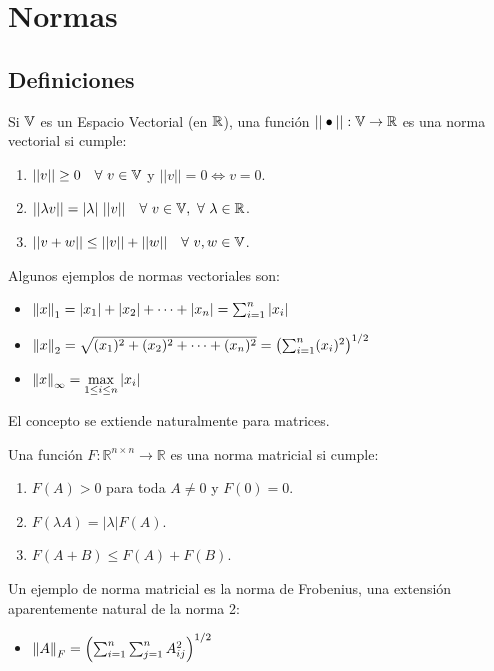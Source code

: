 \section{Normas}

\subsection{Definiciones}

\begin{defi}
Si $\mathbb{V}$ es un Espacio Vectorial (en $\mathbb{R}$), una función
$|| \bullet || : \mathbb{V} \to \mathbb{R}$ es una norma vectorial si cumple:
\begin{enumerate}
\item $||v|| \geq 0 \quad \forall\ v \in \mathbb{V}$ y $||v|| = 0 \iff v = 0$.
\item $||\lambda v|| = |\lambda|\ ||v|| \quad \forall\ v \in \mathbb{V},\ \forall\ \lambda \in \mathbb{R}$.
\item $||v + w|| \leq ||v|| + ||w|| \quad \forall\ v,w \in \mathbb{V}$.
\end{enumerate}
\end{defi}

Algunos ejemplos de normas vectoriales son:
\begin{itemize}
\item $\left\lVert x\right\rVert_1 = |x_1| + |x_2| + \dots + |x_n| = \sum_{i = 1}^{n} |x_i|$
\item $\left\lVert x\right\rVert_2 = \sqrt{(x_1)^2 + (x_2)^2 + \dots + (x_n)^2} = \left(\sum_{i = 1}^{n} (x_i)^2\right)^{1/2}$
\item $\left\lVert x\right\rVert_{\infty} = \max\limits_{1 \leq i \leq n}|x_i|$
\end{itemize}

El concepto se extiende naturalmente para matrices.

\begin{defi}
Una función $F : \mathbb{R}^{n \times n} \to \mathbb{R}$ es una norma matricial si cumple:
\begin{enumerate}
\item $F(A) > 0$ para toda $A \neq 0$ y $F(0) = 0$.
\item $F(\lambda A) = |\lambda| F(A)$.
\item $F(A + B) \leq F(A) + F(B)$.
\end{enumerate}
\end{defi}

Un ejemplo de norma matricial es la norma de Frobenius, una extensión aparentemente natural de la norma 2:
\begin{itemize}
\item $\left\lVert A\right\rVert_F = \left(\sum_{i = 1}^{n} \sum_{j = 1}^{n} A_{ij}^2\right)^{1/2}$
\end{itemize}

